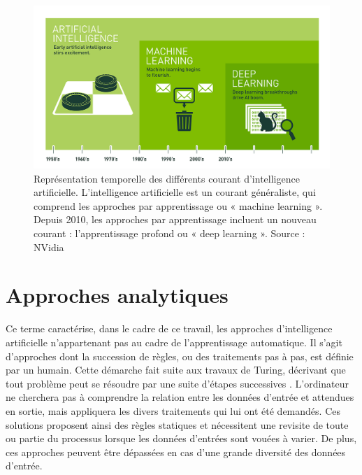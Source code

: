 \begin{figure}[H]
    \centering
    \includegraphics[width=\linewidth]{contents/chapter_3/resources/History.png}
    \caption{Représentation temporelle des différents courant d’intelligence artificielle. L’intelligence artificielle est un courant généraliste, qui comprend les approches par apprentissage ou « machine learning ». Depuis 2010, les approches par apprentissage incluent un nouveau courant : l’apprentissage profond ou « deep learning ». Source : NVidia}
    \label{fig:chapter_3:history}
\end{figure}

\section{Approches analytiques}
Ce terme caractérise, dans le cadre de ce travail, les approches d’intelligence artificielle n’appartenant pas au cadre de l’apprentissage automatique. Il s’agit d’approches dont la succession de règles, ou des traitements pas à pas, est définie par un humain. Cette démarche fait suite aux travaux de Turing, décrivant que tout problème peut se résoudre par une suite d’étapes successives \cite{Turing1937}. L’ordinateur ne cherchera pas à comprendre la relation entre les données d’entrée et attendues en sortie, mais appliquera les divers traitements qui lui ont été demandés.
Ces solutions proposent ainsi des règles statiques et nécessitent une revisite de toute ou partie du processus lorsque les données d’entrées sont vouées à varier. De plus, ces approches peuvent être dépassées en cas d’une grande diversité des données d’entrée.\par
 
